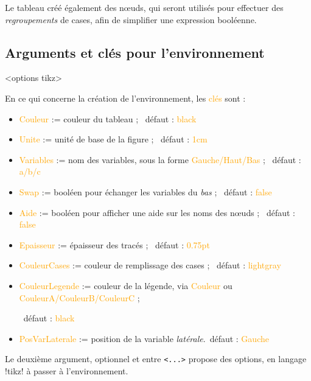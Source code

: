 \documentclass[french,a4paper,11pt]{article}
\newcommand\Cle[1]{{\small\sffamily\textlangle \textcolor{orange}{#1}\textrangle}}
\begin{document}
\begin{tipblock}
Le tableau créé également des nœuds, qui seront utilisés pour effectuer des \textit{regroupements} de cases, afin de simplifier une expression booléenne.
\end{tipblock}

\pagebreak

\subsection{Arguments et clés pour l'environnement}

\begin{DemoCode}
\begin{TableKarnaugh}[clés]<options tikz>
\end{TableKarnaugh}
\end{DemoCode}

\begin{tipblock}
En ce qui concerne la création de l'environnement, les \Cle{clés} sont :

\begin{itemize}
	\item \Cle{Couleur} := couleur du tableau ; \hfill~défaut : \Cle{black}
	\item \Cle{Unite} := unité de base de la figure ; \hfill~défaut : \Cle{1cm}
	\item \Cle{Variables} := nom des variables, sous la forme \Cle{Gauche/Haut/Bas} ; \hfill~défaut : \Cle{a/b/c}
	\item \Cle{Swap} := booléen pour échanger les variables du \textit{bas} ; \hfill~défaut : \Cle{false}
	\item \Cle{Aide} := booléen pour afficher une aide sur les noms des nœuds ; \hfill~défaut : \Cle{false}
	\item \Cle{Epaisseur} := épaisseur des tracés ; \hfill~défaut : \Cle{0.75pt}
	\item \Cle{CouleurCases} := couleur de remplissage des cases ; \hfill~défaut : \Cle{lightgray}
	\item \Cle{CouleurLegende} := couleur de la légende, via \Cle{Couleur} ou \Cle{CouleurA/CouleurB/CouleurC} ;
	
	\hfill~défaut : \Cle{black}
	\item \Cle{PosVarLaterale} := position de la variable \textit{latérale}.\hfill~défaut : \Cle{Gauche}
\end{itemize}

Le deuxième argument, optionnel et entre \texttt{<...>} propose des options, en langage \packagetex!tikz! à passer à l'environnement.
\end{tipblock}
\end{document}
